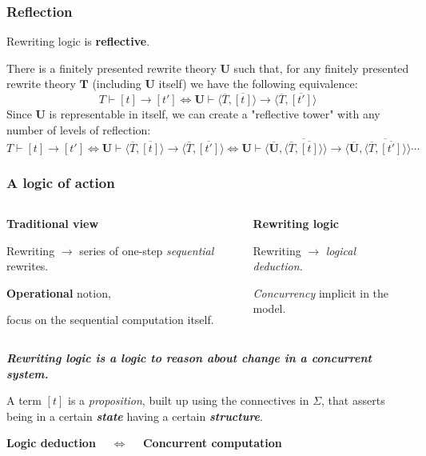 \documentclass{beamer}
\begin{document}
\begin{frame}
    \frametitle{Reflection}

    Rewriting logic is \textbf{reflective}.

    
    \bigskip 
    There is a finitely presented rewrite theory $\mathbf{U}$ such that, for 
        any finitely presented rewrite theory $\mathbf{T}$ (including $\mathbf{U}$ itself) we have 
        the following equivalence:
       {\small $$
        T \vdash [t] \rightarrow [t'] \Longleftrightarrow \mathbf{U} \vdash  \langle \overline{T},\overline{[t]} \rangle  \rightarrow \langle \overline{T},\overline{[t']} \rangle
        $$ 
       }
        \bigskip
    Since $\mathbf{U}$ is representable in itself, we can create a "reflective tower" with any 
    number of levels of reflection:
    {\scriptsize
    $$T \vdash [t] \rightarrow [t'] \Leftrightarrow \mathbf{U} \vdash  \langle \overline{T},\overline{[t]} \rangle  \rightarrow \langle \overline{T},\overline{[t']} \rangle
    \Leftrightarrow\mathbf{U} \vdash  \langle \overline{\mathbf{U}},\overline{\langle \overline{T},\overline{[t]} \rangle} \rangle  \rightarrow  
    \langle \overline{\mathbf{U}},\overline{\langle \overline{T},\overline{[t']} \rangle} \rangle \cdots $$
    }
\end{frame}
\begin{frame}
    \frametitle{A logic of action}
    \small
    \begin{columns}[t]
        \begin{column}{.5\textwidth}
            \textbf{Traditional view}

            \bigskip
            Rewriting $\rightarrow$ series of one-step \emph{sequential} rewrites.

            \bigskip
            \textbf{Operational} notion, 
            
            focus on the sequential computation itself.
        \end{column}

        \begin{column}{.5\textwidth}
            \textbf{Rewriting logic}

            \bigskip
            Rewriting $\rightarrow$ \emph{logical deduction.}

            \bigskip
            \emph{Concurrency} implicit in the  model.
        \end{column}
    \end{columns}
    
    \pause
    \bigskip
    \textbf{\emph{Rewriting logic is a logic to reason about change in a concurrent system.}}

    \bigskip

    A term $[t]$ is a \emph{proposition}, built up using the connectives in $\Sigma$, that asserts being in a certain \emph{\textbf{state}} having a certain \emph{\textbf{structure}}.
    \begin{center}
    \textbf{Logic deduction} $\quad \Leftrightarrow \quad$ \textbf{Concurrent computation}
    \end{center}
\end{frame}
\end{document}
